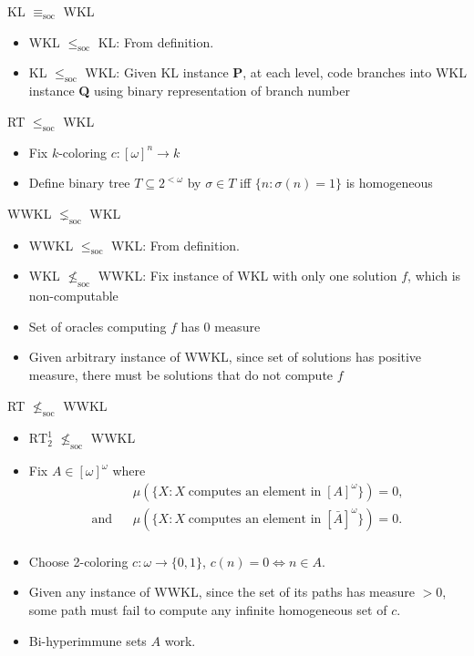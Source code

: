 \documentclass[notes]{beamer}
\begin{document}
\begin{frame}{KL $\equiv_{\text{soc}}$ WKL}
  \begin{itemize}
    \item WKL $\leq_{\text{soc}}$ KL: From definition.
    \item KL $\leq_{\text{soc}}$ WKL: Given KL instance \textbf{P}, at
      each level, code branches into WKL instance \textbf{Q} using binary
      representation of branch number
  \end{itemize}
\end{frame}

\begin{frame}{RT $\leq_{\text{soc}}$ WKL}
  \begin{itemize}
    \item Fix $k$-coloring $c:[\omega]^n\rightarrow k$
    \item Define binary tree $T\subseteq 2^{<\omega}$ by $\sigma\in T$
      iff $\{n:\sigma(n)=1\}$ is homogeneous
  \end{itemize}
\end{frame}

\begin{frame}{WWKL $\lneq_{\text{soc}}$ WKL}
  \begin{itemize}
    \item WWKL $\leq_{\text{soc}}$ WKL: From definition.
    \item WKL $\nleq_{\text{soc}}$ WWKL: Fix instance of WKL with only one
      solution $f$, which is non-computable
    \item Set of oracles computing $f$ has 0 measure
    \item Given arbitrary instance of WWKL, since set of solutions has
      positive measure, there must be solutions that do not compute $f$ 
  \end{itemize}
\end{frame}

\begin{frame}{RT $\nleq_{\text{soc}}$ WWKL}
  \begin{itemize}
    \item $\text{RT}_2^1$ $\nleq_{\text{soc}}$ WWKL
    \item Fix $A\in[\omega]^\omega$ where
      \begin{align*}
        &\mu(\{X: X\; \text{computes an element in}\; [A]^\omega\}) =0,\\
        \text{and}\;\;\; &\mu(\{X: X\; \text{computes an element in}\;
        [\bar{A}]^\omega\}) =0.\\
      \end{align*}
    \item Choose 2-coloring $c:\omega\rightarrow\{0,1\}$, $c(n)=0
      \Leftrightarrow n\in A$.
    \item Given any instance of WWKL, since the set of its paths has
      measure $>0$, some path must fail to compute any infinite
      homogeneous set of $c$. 
    \item Bi-hyperimmune sets $A$ work.
  \end{itemize}
\end{frame}
\end{document}
